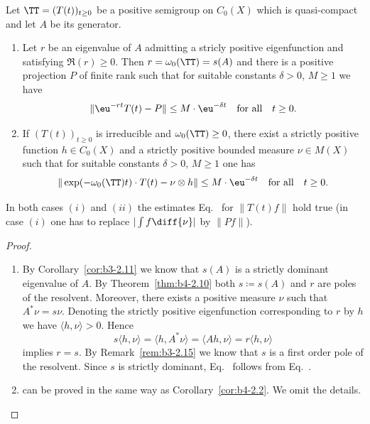 \begin{corollary}\label{cor:b4-2.11}%
%
Let $\TT = (T(t))_{t \geq 0}$ be a positive semigroup on $C_{0}(X)$ which is quasi-compact and let $A$ be its generator.
\begin{enumerate}[\upshape (i)]
	\item	
	Let $r$ be an eigenvalue of\/ $A$ admitting a stricly positive eigenfunction and satisfying $\Re(r) \geq 0$. 
    Then $r = \omega_{0}(\TT) = s(A)$ and there is a positive projection $P$ of finite rank such that for suitable constants $\delta > 0$, $M \geq 1$ we have
	\begin{equation}\label{eq:b4-2.6}
		\|\eu^{-rt}T(t) - P\| \leq M \cdot \eu^{-\delta t} \quad \text{for all} \quad t \geq 0 \text{.}
	\end{equation}
	
	\item 
	If\/ $(T(t))_{t \geq 0}$ is irreducible and $\omega_{0}(\TT) \geq 0$, there exist a strictly positive function $h \in C_{0}(X)$ and a strictly positive bounded measure $\nu \in M(X)$ such that for suitable constants $\delta > 0$, $M \geq 1$ one has
	\begin{equation}\label{eq:b4-2.7}
		\|\exp(-\omega_{0}(\TT)t) \cdot T(t) - \nu \otimes h\| \leq M \cdot \eu^{-\delta t} \quad \text{for all} \quad t \geq 0 \text{.}
	\end{equation}
\end{enumerate}
In both cases $(i)$ and $(ii)$ the estimates Eq.~ for $\|T(t)f\|$ hold true (in case $(i)$ one has to replace $|\int f \diff{\nu}|$ by $\|Pf\|$).
\end{corollary}
\begin{proof}
	\begin{enumerate}[\upshape (i), wide, labelindent=.25em]
		\item 
		By Corollary~\ref{cor:b3-2.11} we know that $s(A)$ is a strictly dominant eigenvalue of\/ $A$. 
        By Theorem~\ref{thm:b4-2.10} both $s  \coloneq  s(A)$ and $r$ are poles of the resolvent. 
        Moreover, there exists a positive measure $\nu$ such that $A^*\nu = s\nu$. 
        Denoting the strictly positive eigenfunction corresponding to $r$ by $h$ we have $\langle h,\nu \rangle > 0$. 
        Hence 
%
\[
	s\langle h,\nu \rangle = \langle h,A^*\nu \rangle = \langle Ah,\nu \rangle = r\langle h,\nu \rangle
\]
%
implies $r = s$. 
By Remark~\ref{rem:b3-2.15} we know that $s$ is a first order pole of the resolvent. Since $s$ is strictly dominant, Eq.~ follows from Eq.~.

\item 
can be proved in the same way as Corollary~\ref{cor:b4-2.2}. 
We omit the details.
	\end{enumerate}
\end{proof}
